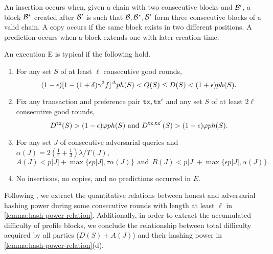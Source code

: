 \begin{definition} \label{def:insertion-copy-prediction}
    An insertion occurs when, given a chain \chain with two consecutive blocks \block and $\mathcal{B}'$, a block $\mathcal{B}^*$ created after $\mathcal{B}'$ is such that $\mathcal{B}, \mathcal{B}^*, \mathcal{B}'$ form three consecutive blocks of a valid chain.
    A copy occurs if the same block exists in two different positions.
    A prediction occurs when a block extends one with later creation time.
\end{definition}

\begin{definition}
    \label{def:typical-execution}

    An execution E is typical if the following hold.
    \begin{enumerate}[label=(\alph*), leftmargin=*, noitemsep]
        \item For any set $S$ of at least $\ell$ consecutive good rounds,
              \[(1 - \epsilon)[1 - (1 + \delta) \gamma^2 f]^\varDelta p h(S) < Q(S) \le D(S) < (1 + \epsilon) p h(S). \]

        \item Fix any transaction \tx and preference pair $\mathtt{tx}, \mathtt{tx}'$ and any set $S$ of at least $2\ell$ consecutive good rounds,
              \[ D^{\mathtt{tx}}(S) > (1 - \epsilon) \varphi p h(S) \text{ and } D^{\mathtt{tx}, \mathtt{tx}'}(S) > (1 - \epsilon) \varphi p h(S). \]

        \item For any set $J$ of consecutive adversarial queries and $\alpha(J) = 2(\frac{1}{\epsilon} + \frac{1}{3})\lambda / T(J)$,
              \[ A(J) < p|J| + \max \{\epsilon p |J|, \tau \alpha(J)\} ~~\text{and}~~ B(J)< p|J| + \max \{\epsilon p |J|, \alpha(J)\}. \]

        \item No insertions, no copies, and no predictions occurred in $E$.
    \end{enumerate}
\end{definition}

Following \cite{EPRINT:GarKiaLeo20}, we extract the quantitative relations between honest and adversarial hashing power during some consecutive rounds with length at least $\ell$ in \cref{lemma:hash-power-relation}.
%
Additionally, in order to extract the accumulated difficulty of profile blocks, we conclude the relationship between total difficulty acquired by all parties ($D(S) + A(J)$) and their hashing power in \cref{lemma:hash-power-relation}(d).

